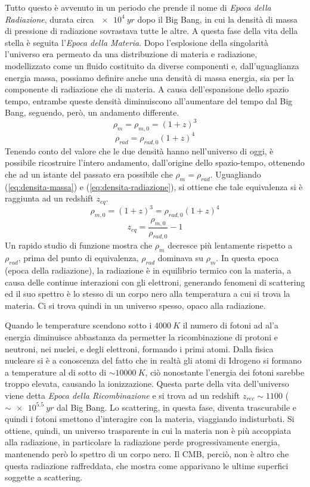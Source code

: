 Tutto questo è avvenuto in un periodo che prende il nome di \textit{Epoca della Radiazione}, durata circa $\SI{e4}{yr}$ dopo il Big Bang, in cui la densità di massa di pressione di radiazione sovrastava tutte le altre. A questa fase della vita della stella è seguita l'\textit{Epoca della Materia}. Dopo l'esplosione della singolarità l'universo era permeato da una distribuzione di materia e radiazione, modellizzato come un fluido costituito da diverse componenti e, dall'uguaglianza energia massa, possiamo definire anche una densità di massa energia, sia per la componente di radiazione che di materia. A causa dell'espansione dello spazio tempo, entrambe queste densità diminuiscono all'aumentare del tempo dal Big Bang, seguendo, però, un andamento differente.
\begin{equation}\label{eq:densita-massa}
    \rho_m = \rho_{m,0} = {(1+z)}^3
\end{equation}
\begin{equation}\label{eq:densita-radiazione}
    \rho_{rad}=\rho_{rad, 0} {(1+z)}^4
\end{equation}
Tenendo conto del valore che le due densità hanno nell'universo di oggi, è possibile ricostruire l'intero andamento, dall'origine dello spazio-tempo, ottenendo che ad un istante del passato era possibile che $\rho_m = \rho_{rad}$. Uguagliando (\ref{eq:densita-massa}) e (\ref{eq:densita-radiazione}), si ottiene che tale equivalenza si è raggiunta ad un redshift $z_{eq}$.
\[
    \rho_{m,0} = {(1+z)}^3 = \rho_{rad, 0} {(1+z)}^4
\]
\[
    z_{eq} = \frac{\rho_{m,0}}{\rho_{rad, 0}} - 1
\]
Un rapido studio di funzione mostra che $\rho_m$ decresce più lentamente rispetto a $\rho_{rad}$, prima del punto di equivalenza, $\rho_{rad}$ dominava su $\rho_{m}$. In questa epoca (epoca della radiazione), la radiazione è in equilibrio termico con la materia, a causa delle continue interazioni con gli elettroni, generando fenomeni di scattering ed il suo spettro è lo stesso di un corpo nero alla temperatura a cui si trova la materia. Ci si trova quindi in un universo spesso, opaco alla radiazione.

Quando le temperature scendono sotto i $\SI{4000}{K}$ il numero di fotoni ad al'a energia diminuisce abbastanza da permetter la ricombinazione di protoni e neutroni, nei nuclei, e degli elettroni, formando i primi atomi. Dalla fisica nucleare si è a conoscenza del fatto che in realtà gli atomi di Idrogeno si formano a temperature al di sotto di $\sim \SI{10000}{K}$, ciò nonostante l'energia dei fotoni sarebbe troppo elevata, causando la ionizzazione. Questa parte della vita dell'universo viene detta \textit{Epoca della Ricombinazione} e si trova ad un redshift $z_{rec} \sim 1100$ ($\sim \SI{e5.5}{yr}$ dal Big Bang. Lo scattering, in questa fase, diventa trascurabile e quindi i fotoni smettono d'interagire con la materia, viaggiando indisturbati. Si ottiene, quindi, un universo trasparente in cui la materia non è più accoppiata alla radiazione, in particolare la radiazione perde progressivamente energia, mantenendo però lo spettro di un corpo nero. Il CMB, perciò, non è altro che questa radiazione raffreddata, che mostra come apparivano le ultime superfici soggette a scattering.

